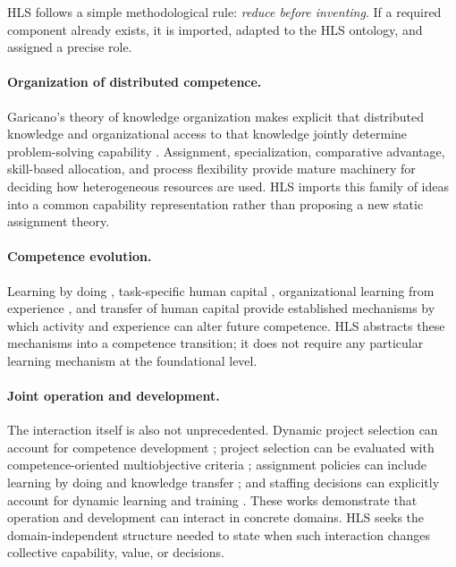 \documentclass[10pt]{article}
\begin{document}
HLS follows a simple methodological rule: \emph{reduce before inventing}. If a required component already exists, it is imported, adapted to the HLS ontology, and assigned a precise role.

\paragraph{Organization of distributed competence.}
Garicano's theory of knowledge organization makes explicit that distributed knowledge and organizational access to that knowledge jointly determine problem-solving capability \cite{garicano2000}. Assignment, specialization, comparative advantage, skill-based allocation, and process flexibility provide mature machinery for deciding how heterogeneous resources are used. HLS imports this family of ideas into a common capability representation rather than proposing a new static assignment theory.

\paragraph{Competence evolution.}
Learning by doing \cite{arrow1962}, task-specific human capital \cite{gibbonswaldman2004}, organizational learning from experience \cite{argotemiron2011}, and transfer of human capital \cite{jovanovicnyarko1995} provide established mechanisms by which activity and experience can alter future competence. HLS abstracts these mechanisms into a competence transition; it does not require any particular learning mechanism at the foundational level.

\paragraph{Joint operation and development.}
The interaction itself is also not unprecedented. Dynamic project selection can account for competence development \cite{gutjahr2011}; project selection can be evaluated with competence-oriented multiobjective criteria \cite{gutjahretal2010multiobjective}; assignment policies can include learning by doing and knowledge transfer \cite{nembhardbentefouet2015}; and staffing decisions can explicitly account for dynamic learning and training \cite{borgonjon2024dynamic}. These works demonstrate that operation and development can interact in concrete domains. HLS seeks the domain-independent structure needed to state when such interaction changes collective capability, value, or decisions.
\end{document}
